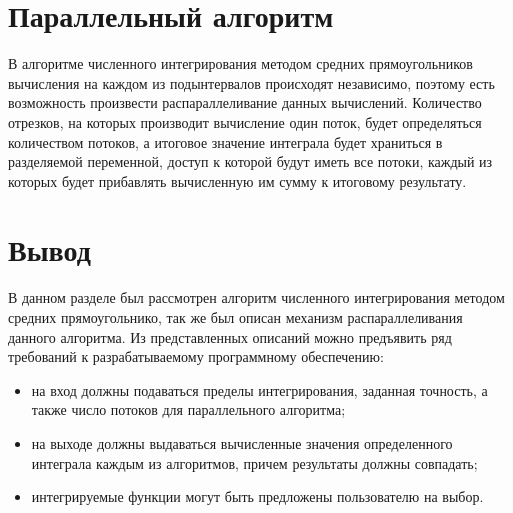 \section{Параллельный алгоритм}

В алгоритме численного интегрирования методом средних прямоугольников
вычисления на каждом из подынтервалов происходят независимо, поэтому есть
возможность произвести распараллеливание данных вычислений. Количество
отрезков, на которых производит вычисление один поток, будет определяться
количеством потоков, а итоговое значение интеграла будет храниться в
разделяемой переменной, доступ к которой будут иметь все потоки, каждый из
которых будет прибавлять вычисленную им сумму к итоговому результату.

\section{Вывод}

В данном разделе был рассмотрен алгоритм численного интегрирования методом
средних прямоугольнико, так же был описан механизм распараллеливания данного
алгоритма. Из представленных описаний можно предъявить ряд требований к
разрабатываемому программному обеспечению:
\begin{itemize}[left=\parindent]
    \item на вход должны подаваться пределы интегрирования, заданная точность,
          а также число потоков для параллельного алгоритма;
    \item на выходе должны выдаваться вычисленные значения определенного
          интеграла каждым из алгоритмов, причем результаты должны совпадать;
    \item интегрируемые функции могут быть предложены пользователю на выбор.
\end{itemize}
